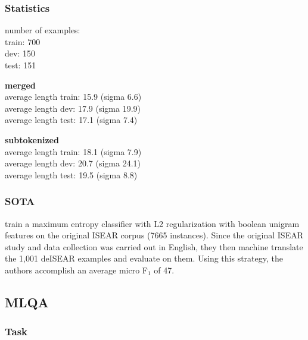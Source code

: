
\subsubsection{Statistics}

number of examples: \\
train: 700 \\
dev: 150 \\
test: 151 

\textbf{merged} \\
average length train: 15.9 (sigma 6.6) \\
average length dev: 17.9 (sigma 19.9) \\
average length test: 17.1 (sigma 7.4)

\textbf{subtokenized} \\
average length train: 18.1 (sigma 7.9) \\
average length dev: 20.7 (sigma 24.1) \\
average length test: 19.5 (sigma 8.8)





\subsubsection{SOTA}

\cite{troiano2019crowdsourcing} train a maximum entropy classifier with L2 regularization with 
boolean unigram features on the original ISEAR corpus (7665 instances). 
Since the original ISEAR study and data collection was carried out in English, they then machine 
translate the 1,001 deISEAR examples and evaluate on them.
Using this strategy, the authors accomplish an average micro F$_1$ of 47.

\subsection{MLQA}

\subsubsection{Task}

